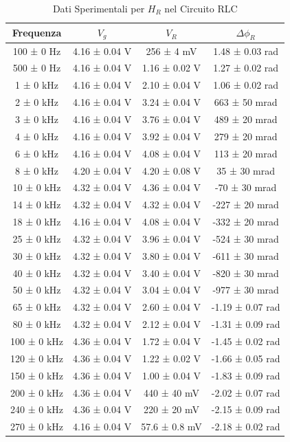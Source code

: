 \documentclass[a4paper]{article}
\begin{document}
\begin{table}[htbp]
\centering
\begin{tabular}{|c|c|c|c|}
\hline
Frequenza & $V_g$ & $V_R$ & $\Delta\phi_R$ \\\hline\hline
100 ± 0 Hz & 4.16 ± 0.04 V & 256 ± 4 mV & 1.48 ± 0.03 rad \\
500 ± 0 Hz & 4.16 ± 0.04 V & 1.16 ± 0.02 V & 1.27 ± 0.02 rad \\
1 ± 0 kHz & 4.16 ± 0.04 V & 2.10 ± 0.04 V & 1.06 ± 0.02 rad \\
2 ± 0 kHz & 4.16 ± 0.04 V & 3.24 ± 0.04 V & 663 ± 50 mrad \\
3 ± 0 kHz & 4.16 ± 0.04 V & 3.76 ± 0.04 V & 489 ± 20 mrad \\
4 ± 0 kHz & 4.16 ± 0.04 V & 3.92 ± 0.04 V & 279 ± 20 mrad \\
6 ± 0 kHz & 4.16 ± 0.04 V & 4.08 ± 0.04 V & 113 ± 20 mrad \\
8 ± 0 kHz & 4.20 ± 0.04 V & 4.20 ± 0.08 V & 35 ± 30 mrad \\
10 ± 0 kHz & 4.32 ± 0.04 V & 4.36 ± 0.04 V & -70 ± 30 mrad \\
14 ± 0 kHz & 4.32 ± 0.04 V & 4.32 ± 0.04 V & -227 ± 20 mrad \\
18 ± 0 kHz & 4.16 ± 0.04 V & 4.08 ± 0.04 V & -332 ± 20 mrad \\
25 ± 0 kHz & 4.32 ± 0.04 V & 3.96 ± 0.04 V & -524 ± 30 mrad \\
30 ± 0 kHz & 4.32 ± 0.04 V & 3.80 ± 0.04 V & -611 ± 30 mrad \\
40 ± 0 kHz & 4.32 ± 0.04 V & 3.40 ± 0.04 V & -820 ± 30 mrad \\
50 ± 0 kHz & 4.32 ± 0.04 V & 3.04 ± 0.04 V & -977 ± 30 mrad \\
65 ± 0 kHz & 4.32 ± 0.04 V & 2.60 ± 0.04 V & -1.19 ± 0.07 rad \\
80 ± 0 kHz & 4.32 ± 0.04 V & 2.12 ± 0.04 V & -1.31 ± 0.09 rad \\
100 ± 0 kHz & 4.36 ± 0.04 V & 1.72 ± 0.04 V & -1.45 ± 0.02 rad \\
120 ± 0 kHz & 4.36 ± 0.04 V & 1.22 ± 0.02 V & -1.66 ± 0.05 rad \\
150 ± 0 kHz & 4.36 ± 0.04 V & 1.00 ± 0.04 V & -1.83 ± 0.09 rad \\
200 ± 0 kHz & 4.36 ± 0.04 V & 440 ± 40 mV & -2.02 ± 0.07 rad \\
240 ± 0 kHz & 4.36 ± 0.04 V & 220 ± 20 mV & -2.15 ± 0.09 rad \\
270 ± 0 kHz & 4.16 ± 0.04 V & 57.6 ± 0.8 mV & -2.18 ± 0.02 rad \\
\hline
\end{tabular}
\caption{Dati Sperimentali per $H_R$ nel Circuito RLC}
\end{table}
\end{document}
